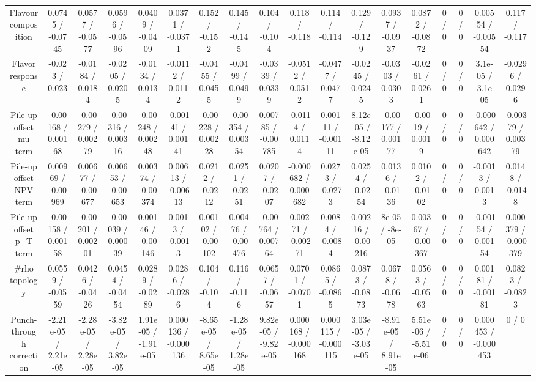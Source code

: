 \documentclass[10pt]{article}
\begin{document}
\begin{table}[htbp]
\begin{center}
\begin{tabular}{|c|c|c|c|c|c|c|c|c|c|c|c|c|c|c|c|c|c|}
  Flavour composition & 0.0745 / -0.0745 & 0.0577 / -0.0577 & 0.0596 / -0.0596 & 0.0409 / -0.0409 & 0.0371 / -0.0371 & 0.152 / -0.152 & 0.145 / -0.145 & 0.104 / -0.104 & 0.118 / -0.118 & 0.114 / -0.114 & 0.129 / -0.129 & 0.0937 / -0.0937 & 0.0872 / -0.0872 & 0 / 0 & 0 / 0 & 0.00554 / -0.00554 & 0.117 / -0.117 \\ 
  Flavor response & -0.023 / 0.023 & -0.0184 / 0.0184 & -0.0205 / 0.0205 & -0.0134 / 0.0134 & -0.0112 / 0.0112 & -0.0455 / 0.0455 & -0.0499 / 0.0499 & -0.0339 / 0.0339 & -0.0512 / 0.0512 & -0.0477 / 0.0477 & -0.0245 / 0.0245 & -0.0303 / 0.0303 & -0.0261 / 0.0261 & 0 / 0 & 0 / 0 & 3.1e-05 / -3.1e-05 & -0.0296 / 0.0296 \\ 
  Pile-up offset mu term & -0.00168 / 0.00168 & -0.00279 / 0.00279 & -0.00316 / 0.00316 & -0.00248 / 0.00248 & -0.00141 / 0.00141 & -0.00228 / 0.00228 & -0.00354 / 0.00354 & 0.00785 / -0.00785 & -0.0114 / 0.0114 & 0.00111 / -0.00111 & 8.12e-05 / -8.12e-05 & -0.00177 / 0.00177 & -0.0019 / 0.0019 & 0 / 0 & 0 / 0 & -0.000642 / 0.000642 & -0.00379 / 0.00379 \\ 
  Pile-up offset NPV term & 0.00969 / -0.00969 & 0.00677 / -0.00677 & 0.00653 / -0.00653 & 0.00374 / -0.00374 & 0.00613 / -0.00613 & 0.0212 / -0.0212 & 0.0251 / -0.0251 & 0.0207 / -0.0207 & -0.000682 / 0.000682 & 0.0273 / -0.0273 & 0.0254 / -0.0254 & 0.0136 / -0.0136 & 0.0102 / -0.0102 & 0 / 0 & 0 / 0 & -0.0013 / 0.0013 & 0.0148 / -0.0148 \\ 
  Pile-up offset p_{T} term & -0.00158 / 0.00158 & -0.00201 / 0.00201 & -0.00039 / 0.00039 & 0.00146 / -0.00146 & 0.0013 / -0.0013 & 0.00102 / -0.00102 & 0.00476 / -0.00476 & -0.00764 / 0.00764 & 0.00271 / -0.00271 & 0.0084 / -0.0084 & 0.00216 / -0.00216 & 8e-05 / -8e-05 & 0.00367 / -0.00367 & 0 / 0 & 0 / 0 & -0.00154 / 0.00154 & 0.000379 / -0.000379 \\ 
  #rho topology & 0.0559 / -0.0559 & 0.0426 / -0.0426 & 0.0454 / -0.0454 & 0.0289 / -0.0289 & 0.0286 / -0.0286 & 0.104 / -0.104 & 0.116 / -0.116 & 0.0657 / -0.0657 & 0.0701 / -0.0701 & 0.0865 / -0.0865 & 0.0873 / -0.0873 & 0.0678 / -0.0678 & 0.0563 / -0.0563 & 0 / 0 & 0 / 0 & 0.00181 / -0.00181 & 0.0823 / -0.0823 \\ 
  Punch-through correction & -2.21e-05 / 2.21e-05 & -2.28e-05 / 2.28e-05 & -3.82e-05 / 3.82e-05 & 1.91e-05 / -1.91e-05 & 0.000136 / -0.000136 & -8.65e-05 / 8.65e-05 & -1.28e-05 / 1.28e-05 & 9.82e-05 / -9.82e-05 & 0.000168 / -0.000168 & 0.000115 / -0.000115 & 3.03e-05 / -3.03e-05 & -8.91e-05 / 8.91e-05 & 5.51e-06 / -5.51e-06 & 0 / 0 & 0 / 0 & 0.000453 / -0.000453 & 0 / 0 \\ 

\end{tabular}
\end{center}
\end{table}
\end{document}
